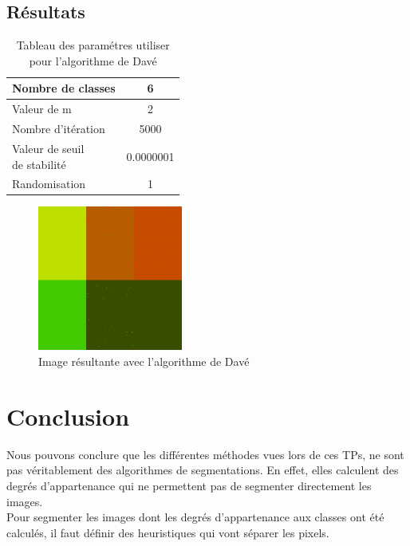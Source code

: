 \documentclass[a4paper,11pt]{article}
\begin{document}
\subsection{Résultats}

\begin{table}[H]
  \begin{center}
    \begin{tabular}{|l|c|}
      \hline
      Nombre de classes & 6 \\
      \hline
      Valeur de m & 2 \\
      \hline
      Nombre d'itération & 5000 \\
      \hline
      \shortstack{ Valeur de seuil \\ de stabilité }  & 0.0000001 \\
      \hline
      Randomisation & 1 \\
      \hline
    \end{tabular}
    \caption{Tableau des paramétres utiliser pour l'algorithme de Davé}
  \end{center}
\end{table}


\begin{figure}[H]
  \begin{center} 
    \includegraphics[width=180px]{../img/segDave.png}
    \caption{Image résultante avec l'algorithme de Davé}
  \end{center}
\end{figure}

\section*{Conclusion}

Nous pouvons conclure que les différentes méthodes vues lors de ces TPs, 
ne sont pas véritablement des algorithmes de segmentations. En effet, 
elles calculent des degrés d'appartenance qui ne permettent pas de 
segmenter directement les images.\\

Pour segmenter les images dont les degrés d'appartenance aux classes ont 
été calculés, il faut définir des heuristiques qui vont séparer les 
pixels.\\
\end{document}
